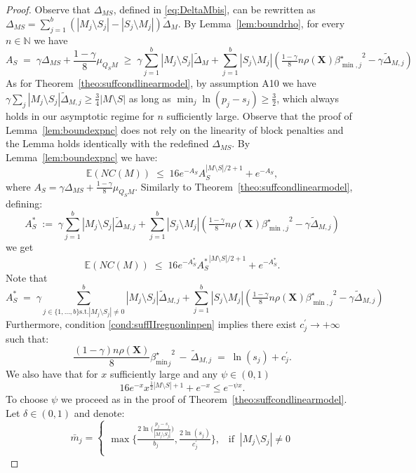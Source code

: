 \documentclass[aos]{imsart}
\theoremstyle{plain}
\newcommand{\E}{\mathbb{E}}
\newcommand{\N}{\mathbb{N}}
\newcommand{\bs}{\boldsymbol}
\begin{document}
\begin{supplement}
\begin{proof}
Observe that $\Delta_{MS}$, defined in \eqref{eq:DeltaMbis}, can be rewritten as $\Delta_{MS}=\sum_{j=1}^b(|M_j\setminus S_j|-|S_j\setminus M_j|)\tilde{\Delta}_{M}$. By  Lemma~\ref{lem:boundrho}, for every $n\in \N$ we have 
\begin{equation}\label{eq:nonoverfittingcondgen}
   A_S\;=\; \gamma \Delta_{MS}+\frac{1-\gamma}{8}\mu_{Q_SM}\;\geq\; \gamma\sum_{j=1}^b|M_j \setminus S_j|\tilde{\Delta}_{M} + \sum_{j=1}^b |S_j\setminus M_j |\left(\tfrac{1-\gamma}{8} n \rho(\bs X) {\beta^{\star}_{\min,j}}^{2} - \gamma\tilde{\Delta}_{M, j}\right) 
\end{equation} 
As for Theorem~\ref{theo:suffcondlinearmodel}, by assumption A10 we have $\gamma\sum_{j}|M_j\setminus S_j|\tilde{\Delta}_{M, j}\geq \tfrac{3}{4}|M\setminus S|$ as long as $\min_j \ln(p_j-s_j)\geq \tfrac32$, which always holds in our asymptotic regime for $n$ sufficiently large. Observe that the proof of Lemma~\ref{lem:boundexpnc} does not rely on the linearity of block penalties and the Lemma holds identically with the redefined $\Delta_{MS}$.  By Lemma~\ref{lem:boundexpnc} we have:
$$
\E(NC(M))\;\leq\;16 e^{-A_S}A_S^{|M\setminus S|/2+1}+e^{-A_S},
$$
where $A_S=\gamma\Delta_{MS}+\tfrac{1-\gamma}{8}\mu_{Q_SM}$. Similarly to Theorem~\ref{theo:suffcondlinearmodel}, defining:
$$A_S^*\;:=\;\gamma\sum_{j=1}^b|M_j \setminus S_j|\tilde{\Delta}_{M, j} + \sum_{j=1}^b |S_j\setminus M_j |\left(\tfrac{1-\gamma}{8} n \rho(\bs X) {\beta^{\star}_{\min,j}}^{2} - \gamma\tilde{\Delta}_{M, j}\right) $$
we get 
$$
\E(NC(M))\;\leq\;16 e^{-A_S^*}{A_S^*}^{|M\setminus S|/2+1}+e^{-A_S^*}.
$$
Note that 
$$A_S^*\;=\;\gamma\sum_{j \in \{1,\ldots, b\} \text{s.t.} |M_j \setminus S_j| \neq 0}^b|M_j \setminus S_j|\tilde{\Delta}_{M, j} + \sum_{j=1}^b |S_j\setminus M_j |\left(\tfrac{1-\gamma}{8} n \rho(\bs X) {\beta^{\star}_{\min,j}}^{2} - \gamma\tilde{\Delta}_{M, j}\right) $$
Furthermore, condition \eqref{cond:suffIIregnonlinpen} implies there exist $c^{\prime}_j \to +\infty$ such that:
$$\frac{(1-\gamma) n\rho(\bs X)}{8}{{\beta_{\min}^{\star}}_j}^2 \,- \,\tilde{\Delta}_{M, j} \;=\; \ln(s_j) + c^{\prime}_{j}.$$
We also have that for $x$ sufficiently large and any $\psi \in (0,1)$
\begin{equation}%
16e^{-x}x^{\tfrac12|M\setminus S|+1}+e^{-x}\leq e^{-\psi x}.    
\end{equation}
To choose $\psi$ we proceed as in the proof of Theorem~\ref{theo:suffcondlinearmodel}. Let $\delta \in (0,1)$ and denote:
$$\bar{m}_j=\begin{cases}
    \max\bigg\{\tfrac{2\ln\big(\tfrac{p_j-s_j}{|M_j\setminus S_j|}\big)}{b_{j}},\tfrac{2\ln(s_j)}{c^{\prime}_{j}}\bigg\},\;\;\; \text{if}\;\;|M_j \setminus S_j| \neq 0 \\

\end{cases}$$
\end{proof}
\end{supplement}
\end{document}
